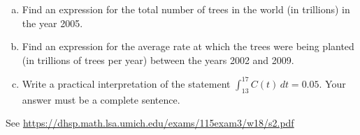 \documentclass[11pt]{exam}
\begin{document}
\begin{questions}
\begin{enumerate}[(a)]
	\item Find an expression for the total number of trees in the world (in trillions) in the year 2005.
	\item Find an expression for the average rate at which the trees were being planted (in trillions of trees per year) between the years 2002 and 2009.
	\item Write a practical interpretation of the statement $\displaystyle\int_{13}^{17} C(t) \, dt = 0.05$. Your answer must be a complete sentence.
\end{enumerate}
\begin{solution}
  See \href{https://dhsp.math.lsa.umich.edu/exams/115exam3/w18/s2.pdf}{https://dhsp.math.lsa.umich.edu/exams/115exam3/w18/s2.pdf}
\end{solution}
\end{questions}
\end{document}
